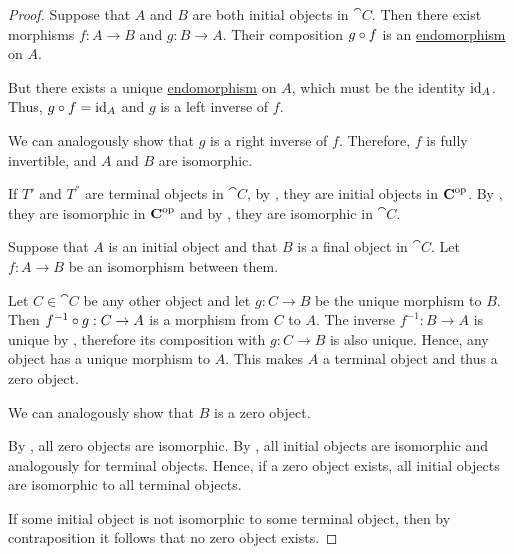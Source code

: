 \begin{proof}
   Suppose that \( A \) and \( B \) are both initial objects in \( \cat{C} \). Then there exist morphisms \( f: A \to B \) and \( g: B \to A \). Their composition \( g \bincirc f \) is an \hyperref[def:morphism_invertibility/endomorphism]{endomorphism} on \( A \).

  But there exists a unique \hyperref[def:morphism_invertibility/endomorphism]{endomorphism} on \( A \), which must be the identity \( \operatorname{id}_A \). Thus, \( g \bincirc f = \id_A \) and \( g \) is a left inverse of \( f \).

  We can analogously show that \( g \) is a right inverse of \( f \). Therefore, \( f \) is fully invertible, and \( A \) and \( B \) are isomorphic.

   If \( T' \) and \( T^\dprime \) are terminal objects in \( \cat{C} \), by , they are initial objects in \( \operatorname{\mathbf{C}}^{\operatorname{op}} \). By , they are isomorphic in \( \operatorname{\mathbf{C}}^{\operatorname{op}} \) and by , they are isomorphic in \( \cat{C} \).

   Suppose that \( A \) is an initial object and that \( B \) is a final object in \( \cat{C} \). Let \( f: A \to B \) be an isomorphism between them.

  Let \( C \in \cat{C} \) be any other object and let \( g: C \to B \) be the unique morphism to \( B \). Then \( f^{-1} \bincirc g: C \to A \) is a morphism from \( C \) to \( A \). The inverse \( f^{-1}: B \to A \) is unique by , therefore its composition with \( g: C \to B \) is also unique. Hence, any object has a unique morphism to \( A \). This makes \( A \) a terminal object and thus a zero object.

  We can analogously show that \( B \) is a zero object.

   By , all zero objects are isomorphic. By , all initial objects are isomorphic and analogously for terminal objects. Hence, if a zero object exists, all initial objects are isomorphic to all terminal objects.

  If some initial object is not isomorphic to some terminal object, then by contraposition it follows that no zero object exists.
\end{proof}
